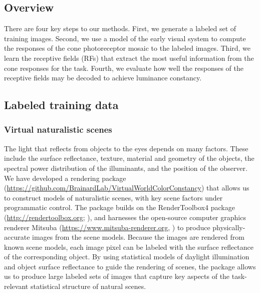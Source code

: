 \documentclass{jov}
\begin{document}
\subsection{Overview}
There are four key steps to our methods.  First, we generate a labeled set of training images.  Second, we use a model of the early visual system to compute the responses of the cone photoreceptor mosaic to the labeled images. Third, we learn the receptive fields (RFs) that extract the most useful information from the cone responses for the task. Fourth, we evaluate how well the responses of the receptive fields may be decoded to achieve luminance constancy.

\subsection{Labeled training data} \label{method:VirtualWorld}
\subsubsection{Virtual naturalistic scenes}
The light that reflects from objects to the eyes depends on many factors.
These include the surface reflectance, texture, material and geometry of the objects, 
the spectral power distribution of the illuminants, and the position of the observer.
We have developed a rendering package 
(\href{https://github.com/BrainardLab/VirtualWorldColorConstancy}{https://github.com/BrainardLab/VirtualWorldColorConstancy}) 
that allows us to construct models of naturalistic scenes, with key scene factors under programmatic control.
The package builds on the RenderToolbox4 package (\href{http://rendertoolbox.org}{http://rendertoolbox.org}; ),
and harnesses the open-source computer graphics renderer Mitsuba (\href{https://www.mitsuba-renderer.org}{https://www.mitsuba-renderer.org}, 
) to produce physically-accurate images from the scene models.
Because the images are rendered from known scene models, each image pixel can be labeled with 
the surface reflectance of the corresponding object.
By using statistical models of daylight illumination and object surface reflectance to guide the rendering of scenes, 
the package allows us to produce large labeled sets of images that capture key aspects of the task-relevant 
statistical structure of natural scenes.
\end{document}
